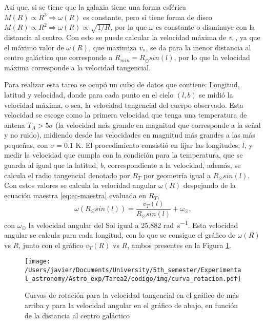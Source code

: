 \documentclass[letterpaper,oneside]{article}
\begin{document}
Así que, si se tiene que la galaxia tiene una forma esférica $M(R) \propto R^3\Rightarrow\omega(R)$ es constante, pero si tiene forma de disco $M(R) \propto R^2\Rightarrow\omega(R)\propto \sqrt{1/R}$, por lo que $\omega$ es constante o disminuye con la distancia al centro. Con esto se puede calcular la velocidad máxima de $v_{\shortparallel}$, ya que el máximo valor de  $\omega(R)$, que maximiza $v_{\shortparallel}$, se da para la menor distancia al centro galáctico que corresponde a $R_{min}=R_{\odot}sin(l)$, por lo que la velocidad máxima corresponde a la velocidad tangencial.


Para realizar esta tarea se ocupó un cubo de datos que contiene: Longitud, latitud y velocidad, donde para cada punto en el cielo $(l,b)$ se midió la velocidad máxima, o sea, la velocidad tangencial del cuerpo observado. Esta velocidad se escoge como la primera velocidad que tenga una temperatura de antena $T_A>5\sigma$ (la velocidad más grande en magnitud que corresponde a la señal y no ruido), midiendo desde las velocidades en magnitud más grandes a las más pequeñas, con $\sigma =0.1$ \si{\kelvin}. El procedimiento consistió en fijar las longitudes, $l$, y medir la velocidad que cumpla con la condición para la temperatura, que se guarda al igual que la latitud, $b$, correspondiente a la velocidad, además, se calcula el radio tangencial denotado por $R_T$ por geometría igual a $R_{\odot}sin(l)$. Con estos valores se calcula la velocidad angular $\omega(R)$ despejando de la ecuación maestra \ref{eq:ec-maestra} evaluada en $R_T$,
\begin{equation*}
\omega(R_{\odot}sin(l))=\frac{v_T(l)}{R_{\odot}sin(l)}+\omega_{\odot},
\end{equation*}
con $\omega_{\odot}$ la velocidad angular del Sol igual a 25.882 \si{\radian\per\second}. Esta velocidad angular se calcula para cada longitud, con lo que se consigue el gráfico de $\omega(R)$ vs $R$, junto con el gráfico $v_T(R)$ vs $R$, ambos presentes en la Figura \ref{fig:curva-rotacion}.
\begin{figure}[H]
    \centering
    \texttt{[image: /Users/javier/Documents/University/5th\_semester/Experimental\_astronomy/Astro\_exp/Tarea2/codigo/img/curva\_rotacion.pdf]}
    \caption{Curvas de rotación para la velocidad tangencial en el gráfico de más arriba y para la velocidad angular en el gráfico de abajo, en función de la distancia al centro galáctico}
    \label{fig:curva-rotacion}
\end{figure}
\newpage
\end{document}
